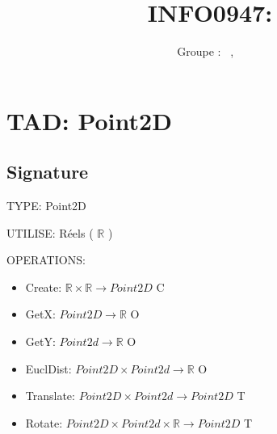 \documentclass[a4paper, 11pt, oneside]{article}
\title{INFO0947: \intitule}
\author{Groupe \GrNbr : \PrenomUN~\textsc{\NomUN}, \PrenomDEUX~\textsc{\NomDEUX}}
\date{}
\newcommand{\tablemat}{~}
\renewcommand{\tablemat}{\tableofcontents}
\begin{document}
\maketitle
\newpage
\tablemat
\newpage


\section{TAD: Point2D}

\subsection{Signature}

\noindent TYPE: Point2D

\noindent UTILISE: Réels ( $\mathbb{R}$ )

\noindent OPERATIONS: 
\begin{itemize}
    \item Create: $\mathbb{R} \times \mathbb{R} \xrightarrow{} Point2D$ {\color{green} C}
    \item GetX: $Point2D \xrightarrow{} \mathbb{R}$ {\color{green} O}
    \item GetY: $Point2d \xrightarrow{} \mathbb{R}$ {\color{green} O}
    \item EuclDist: $Point2D \times Point2d \xrightarrow{} \mathbb{R}$ {\color{green} O}
    \item Translate: $Point2D \times Point2d \xrightarrow{} Point2D$ {\color{green} T}
    \item Rotate: $Point2D \times Point2d \times \mathbb{R} \xrightarrow{} Point2D $ {\color{green} T}
\end{itemize}
\end{document}
